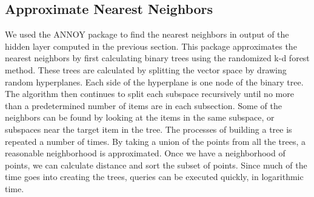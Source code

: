 \subsection{Approximate Nearest Neighbors}
We used the ANNOY package to find the nearest neighbors in output of the hidden layer computed in the previous section.\cite{annoy_impl} This package approximates the nearest neighbors by first calculating binary trees using the randomized k-d forest method.\cite{ann_paper} These trees are calculated by splitting the vector space by drawing random hyperplanes. Each side of the hyperplane is one node of the binary tree. The algorithm then continues to split each subspace recursively until no more than a predetermined number of items are in each subsection. Some of the neighbors can be found by looking at the items in the same subspace, or subspaces near the target item in the tree. The processes of building a tree is repeated a number of times. By taking a union of the points from all the trees, a reasonable neighborhood is approximated. Once we have a neighborhood of points, we can calculate distance and sort the subset of points. Since much of the time goes into creating the trees, queries can be executed quickly, in logarithmic time.
